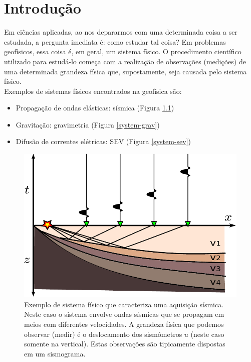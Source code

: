 \chapter{Introdução}
\label{chap:intro}

\indent Em ciências aplicadas, ao nos depararmos com uma determinada coisa a ser
estudada, a pergunta imediata é: como estudar tal coisa? Em problemas geofísicos,
essa coisa é, em geral, um sistema físico. O procedimento científico utilizado
para estudá-lo começa com a realização de observações (medições) de uma
determinada grandeza física que, supostamente, seja causada pelo sistema físico.
\\
\indent Exemplos de sistemas físicos encontrados na geofísica são:

\begin{itemize}
    \item{Propagação de ondas elásticas: sísmica (Figura \ref{system-seismic})}
    \item{Gravitação: gravimetria (Figura \ref{system-grav})}
    \item{Difusão de correntes elétricas: SEV (Figura \ref{system-sev})}
\end{itemize}

\begin{figure}
    \centering
    \includegraphics[scale=1]{figs/system-seismic}
    \caption{Exemplo de sistema físico que caracteriza uma aquisição sísmica.
        Neste caso o sistema envolve ondas sísmicas que se propagam em meios com
        diferentes velocidades. A grandeza física que podemos observar (medir)
        é o deslocamento dos sismômetros $u$ (neste caso somente na vertical).
        Estas observações são tipicamente dispostas em um sismograma.}
    \label{system-seismic}
\end{figure}

